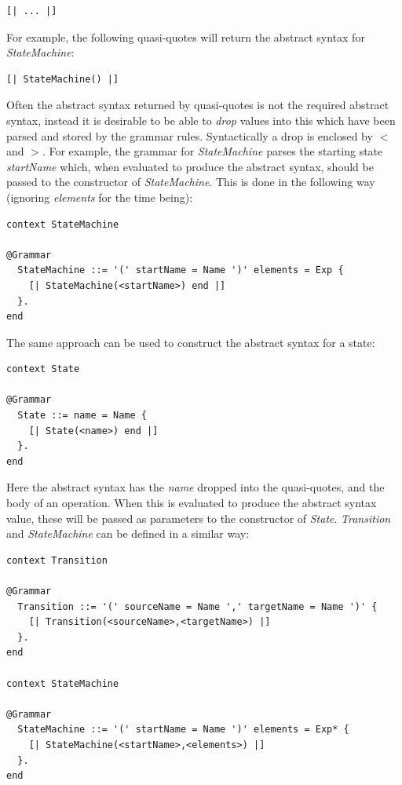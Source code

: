 \begin{lstlisting}
[| ... |]
\end{lstlisting}\noindent For example, the following quasi-quotes will return the
abstract syntax for \emph{StateMachine}:

\begin{lstlisting}
[| StateMachine() |]
\end{lstlisting}Often the abstract syntax returned by quasi-quotes is not the required abstract syntax, instead it is desirable to be able to \emph{drop} values into this which have been parsed and stored by the grammar rules.  Syntactically a drop is enclosed by \emph{$<$} and \emph{$>$}.  For example, the grammar for \emph{StateMachine} parses the starting state \emph{startName} which, when evaluated to produce the abstract syntax, should be passed to the constructor of \emph{StateMachine}.  This is done in the following way (ignoring \emph{elements} for the time being):

\begin{lstlisting}
context StateMachine

@Grammar
  StateMachine ::= '(' startName = Name ')' elements = Exp {
    [| StateMachine(<startName>) end |]
  }.
end
\end{lstlisting}The same approach can be used to construct the abstract syntax for a state:

%
\begin{lstlisting}
context State

@Grammar
  State ::= name = Name {
    [| State(<name>) end |]
  }.
end
\end{lstlisting}\noindent Here the abstract syntax has the \emph{name} dropped into the quasi-quotes, and the body of an operation.  When this is evaluated to produce the abstract syntax value, these will be passed as parameters to the constructor of \emph{State}.  \emph{Transition} and \emph{StateMachine} can be defined in a similar way:

\begin{lstlisting}
context Transition

@Grammar
  Transition ::= '(' sourceName = Name ',' targetName = Name ')' {
    [| Transition(<sourceName>,<targetName>) |]
  }.
end

context StateMachine

@Grammar
  StateMachine ::= '(' startName = Name ')' elements = Exp* {
    [| StateMachine(<startName>,<elements>) |]
  }.
end
\end{lstlisting}%


